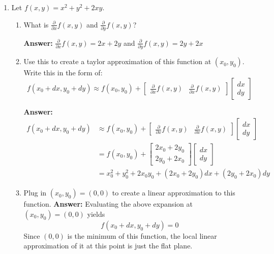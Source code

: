 \documentclass[12pt]{article}
\newcommand{\answer}[1]{{\color{blue_winged_teal}\textbf{Answer:} #1}}
\begin{document}
\begin{enumerate}
  \bigskip\bigskip
  \item Let $f(x, y) = x^2 + y^2 + 2xy$.
  \begin{enumerate}
    \item What is $\frac{\partial}{\partial x} f(x,y)$ and $\frac{\partial}{\partial y} f(x,y)$?
    
    \answer{
      $\frac{\partial}{\partial x} f(x,y) = 2x + 2y$ and 
      $\frac{\partial}{\partial y} f(x,y) = 2y + 2x$
    }
    
    \item Use this to create a taylor approximation of this function at $(x_0, y_0)$. Write this in the form of:
    $$
      f(x_0 + dx, y_0 + dy) \approx f(x_0, y_0) + \begin{bmatrix}\frac{\partial}{\partial x} f(x,y) & \frac{\partial}{\partial x} f(x,y)\end{bmatrix} \begin{bmatrix}dx \\ dy\end{bmatrix}
    $$

    \answer{
      \begin{align*}
        f(x_0 + dx, y_0 + dy) &\approx f(x_0, y_0) + \begin{bmatrix}\frac{\partial}{\partial x} f(x,y) & \frac{\partial}{\partial x} f(x,y)\end{bmatrix} \begin{bmatrix}dx \\ dy\end{bmatrix} \\
        &= f(x_0, y_0) + \begin{bmatrix} 2x_0 + 2y_0 \\ 2y_0 + 2x_0 \end{bmatrix} \begin{bmatrix}dx \\ dy\end{bmatrix} \\
        &= x_0^2 + y_0^2 + 2x_0y_0 + (2x_0 + 2y_0) dx + (2y_0 + 2x_0) dy
      \end{align*}
    }

    \item Plug in $(x_0, y_0) = (0, 0)$ to create a linear approximation to this function.
    \answer{
      Evaluating the above expansion at $(x_0, y_0) = (0, 0)$ yields
      $$
        f(x_0 + dx, y_0 + dy) = 0
      $$
      Since $(0, 0)$ is the minimum of this function, the local linear approximation of it at this point is just the flat plane.
    }
  \end{enumerate}
\end{enumerate}
\end{document}
